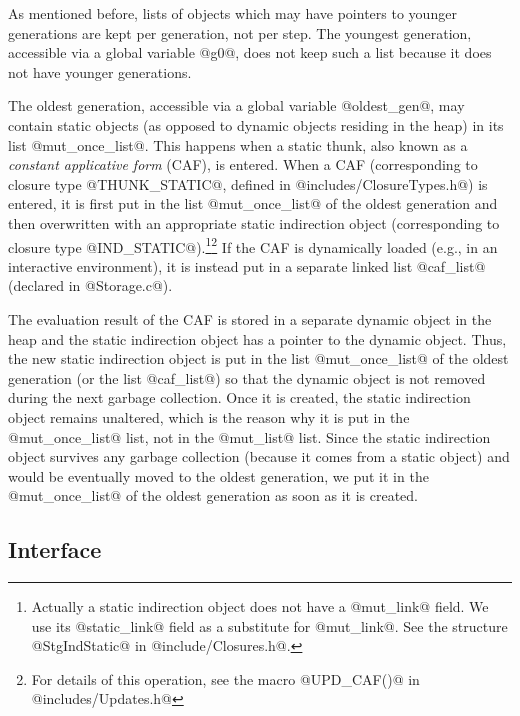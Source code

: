 \documentclass{article}
\begin{document}
As mentioned before, lists of objects which may have pointers to younger
generations are kept per generation, not per step. The youngest generation,
accessible via a global variable @g0@, does not keep such a list because it
does not have younger generations.

The oldest generation, accessible via a global variable @oldest_gen@, may
contain static objects (as opposed to dynamic objects residing in the heap)
in its list @mut_once_list@. This happens when a static
thunk, also known as a \emph{constant applicative form} (CAF), is entered.
When a CAF (corresponding to closure type @THUNK_STATIC@, defined
in @includes/ClosureTypes.h@) is entered, 
it is first put in the list @mut_once_list@ of the oldest generation
and then overwritten with an appropriate static indirection object 
(corresponding to closure type @IND_STATIC@).\footnote{Actually a static 
indirection object does not have a @mut\_link@ field.
We use its @static\_link@ field as a substitute for @mut\_link@.
See the structure @StgIndStatic@ in @include/Closures.h@.}\footnote{For
details of this operation, see the macro @UPD\_CAF()@ in @includes/Updates.h@}
If the CAF is dynamically loaded (e.g., in an interactive environment), it is 
instead put in a separate linked list @caf_list@ 
(declared in @Storage.c@). 

The evaluation result of the 
CAF is stored in a separate dynamic object in the heap and the static 
indirection object has a pointer to the dynamic object.
Thus, the new static indirection object is put in the list 
@mut_once_list@ of the oldest generation (or the list @caf_list@) so that the 
dynamic object is not removed during the next garbage collection.
Once it is created, the static indirection object remains unaltered, which
is the reason why it is put in the @mut_once_list@ list, not in the 
@mut_list@ list.
Since the static indirection object survives any garbage collection (because
it comes from a static object) and would be eventually moved to the oldest 
generation,
we put it in the @mut_once_list@ of the oldest generation as soon
as it is created.

\subsection{Interface}
\end{document}
